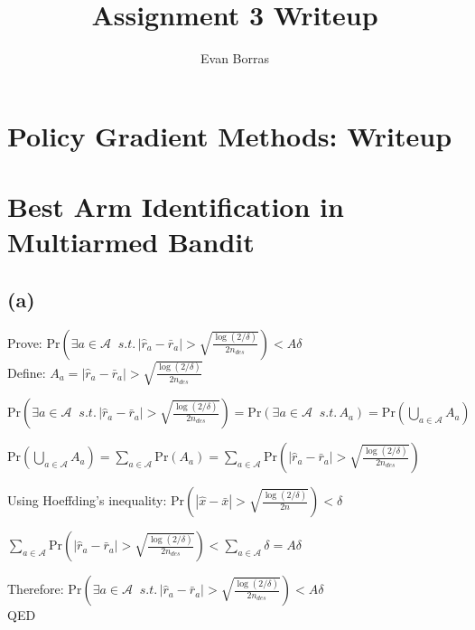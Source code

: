 \documentclass{article}
\author{Evan Borras}
\title{Assignment 3 Writeup}
\begin{document}
\maketitle

\section*{Policy Gradient Methods: Writeup}
\section*{Best Arm Identification in Multiarmed Bandit}
\subsection*{(a)}

Prove: $\mathrm{Pr}\left(\exists a \in \mathcal{A} \; \; s.t. \, \left|\hat{r}_{a} - \bar{r}_{a} \right| > \sqrt{\frac{\log (2/\delta)}{2n_{des}}} \right) < A\delta$ \\ 

Define: $A_{a} = |\hat{r}_{a} - \bar{r}_{a}| > \sqrt{\frac{\log (2/\delta)}{2n_{des}}}$

$\mathrm{Pr}\left(\exists a \in \mathcal{A} \; \; s.t. \, \left|\hat{r}_{a} - \bar{r}_{a} \right| > \sqrt{\frac{\log (2/\delta)}{2n_{des}}} \right) = \mathrm{Pr}\left(\exists a \in \mathcal{A} \; \; s.t. \, A_{a}\right) = \mathrm{Pr}\left(\bigcup\limits_{a \in \mathcal{A}} A_{a} \right)$

$\mathrm{Pr}\left(\bigcup\limits_{a \in \mathcal{A}} A_{a}\right) = \sum\limits_{a \in \mathcal{A}} \mathrm{Pr}\left(A_{a}\right) = \sum\limits_{a \in \mathcal{A}} \mathrm{Pr}\left(|\hat{r}_{a} - \bar{r}_{a}| > \sqrt{\frac{\log (2/\delta)}{2n_{des}}}\right)$

Using Hoeffding's inequality: $\mathrm{Pr}\left(|\hat{x} - \bar{x}| > \sqrt{\frac{\log (2/\delta)}{2n}}\right) < \delta$


$\sum\limits_{a \in \mathcal{A}} \mathrm{Pr}\left(|\hat{r}_{a} - \bar{r}_{a}| > \sqrt{\frac{\log (2/\delta)}{2n_{des}}}\right) < \sum\limits_{a \in \mathcal{A}} \delta = A\delta$

Therefore: $\mathrm{Pr}\left(\exists a \in \mathcal{A} \; \; s.t. \, \left|\hat{r}_{a} - \bar{r}_{a} \right| > \sqrt{\frac{\log (2/\delta)}{2n_{des}}} \right) < A\delta$ \\

QED
 
\end{document}
